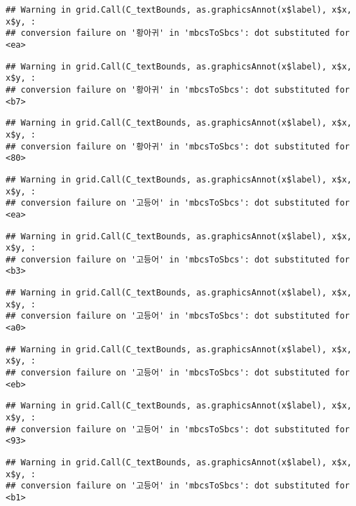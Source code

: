 \documentclass[
]{article}
\begin{document}
\begin{verbatim}
## Warning in grid.Call(C_textBounds, as.graphicsAnnot(x$label), x$x, x$y, :
## conversion failure on '황아귀' in 'mbcsToSbcs': dot substituted for <ea>
\end{verbatim}

\begin{verbatim}
## Warning in grid.Call(C_textBounds, as.graphicsAnnot(x$label), x$x, x$y, :
## conversion failure on '황아귀' in 'mbcsToSbcs': dot substituted for <b7>
\end{verbatim}

\begin{verbatim}
## Warning in grid.Call(C_textBounds, as.graphicsAnnot(x$label), x$x, x$y, :
## conversion failure on '황아귀' in 'mbcsToSbcs': dot substituted for <80>
\end{verbatim}

\begin{verbatim}
## Warning in grid.Call(C_textBounds, as.graphicsAnnot(x$label), x$x, x$y, :
## conversion failure on '고등어' in 'mbcsToSbcs': dot substituted for <ea>
\end{verbatim}

\begin{verbatim}
## Warning in grid.Call(C_textBounds, as.graphicsAnnot(x$label), x$x, x$y, :
## conversion failure on '고등어' in 'mbcsToSbcs': dot substituted for <b3>
\end{verbatim}

\begin{verbatim}
## Warning in grid.Call(C_textBounds, as.graphicsAnnot(x$label), x$x, x$y, :
## conversion failure on '고등어' in 'mbcsToSbcs': dot substituted for <a0>
\end{verbatim}

\begin{verbatim}
## Warning in grid.Call(C_textBounds, as.graphicsAnnot(x$label), x$x, x$y, :
## conversion failure on '고등어' in 'mbcsToSbcs': dot substituted for <eb>
\end{verbatim}

\begin{verbatim}
## Warning in grid.Call(C_textBounds, as.graphicsAnnot(x$label), x$x, x$y, :
## conversion failure on '고등어' in 'mbcsToSbcs': dot substituted for <93>
\end{verbatim}

\begin{verbatim}
## Warning in grid.Call(C_textBounds, as.graphicsAnnot(x$label), x$x, x$y, :
## conversion failure on '고등어' in 'mbcsToSbcs': dot substituted for <b1>
\end{verbatim}
\end{document}
